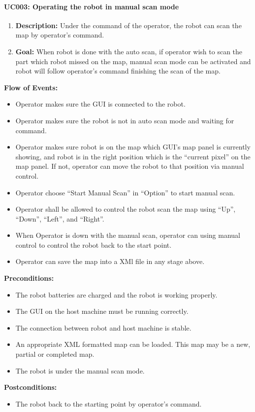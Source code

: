 \documentclass[11pt, a4paper]{report}
\begin{document}
\paragraph{UC003: Operating the robot in manual scan mode} %
\label{par:uc003_operating_the_robot_in_manual_scan_mode}
\begin{enumerate}
    \item \textbf{Description:} Under the command of the operator, the robot can scan the map by operator's command.
    \item \textbf{Goal:} When robot is done with the auto scan, if operator wish to scan the part which robot missed on the map, manual scan mode can be activated and robot will follow operator's command finishing the scan of the map.
  \end{enumerate}
  \textbf{Flow of Events:} 
  \begin{itemize}
  	\item Operator makes sure the GUI is connected to the robot.
  	\item Operator makes sure the robot is not in auto scan mode and waiting for command.
  	\item Operator makes sure robot is on the map which GUI's map panel is currently showing, and robot is in the right position which is the ``current pixel'' on the map panel. If not, operator can move the robot to that position via manual control.
  	\item Operator choose ``Start Manual Scan'' in ``Option'' to start manual scan.
  	\item Operator shall be allowed to control the robot scan the map using ``Up'', ``Down'', ``Left'', and ``Right''.
  	\item When Operator is down with the manual scan, operator can using manual control to control the robot back to the start point.
  	\item Operator can save the map into a XMl file in any stage above.
  \end{itemize}
	\textbf{Preconditions:}
  \begin{itemize}
    \item The robot batteries are charged and the robot is working properly.
    \item The GUI on the host machine must be running correctly.
    \item The connection between robot and host machine is stable.
    \item An appropriate XML formatted map can be loaded. This map may be a new, partial or
completed map.
    \item The robot is under the manual scan mode.
  \end{itemize}
  \textbf{Postconditions:}
  \begin{itemize}
    \item The robot back to the starting point by operator's command.
  \end{itemize}
\pagebreak
\end{document}
